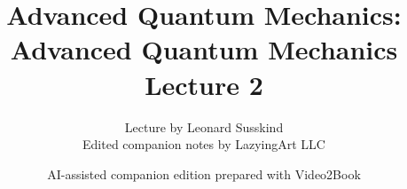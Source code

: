 \documentclass[11pt,oneside]{book}
\begin{document}
\frontmatter
\title{Advanced Quantum Mechanics: Advanced Quantum Mechanics Lecture 2}
\author{Lecture by Leonard Susskind\\Edited companion notes by LazyingArt LLC}
\date{AI-assisted companion edition prepared with Video2Book}
\maketitle
\clearpage
\mainmatter

\end{document}
